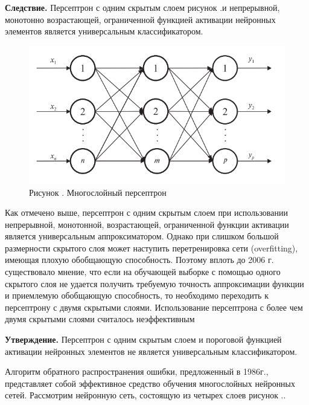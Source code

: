{	\par \redline \textbf{Следствие.} Персептрон с одним скрытым слоем рисунок \thechaptercntr.\theimagecntr \spc и непрерывной,
	монотонно возрастающей, ограниченной функцией активации нейронных элементов является универсальным классификатором.
	
	\begin{figure}[H]
		\centering
		\def\svgwidth{\textwidth}
		\includegraphics[scale=1.2]{images/one_hidden_perceptron.png}
		\caption*{\gostFont Рисунок \thechaptercntr .\theimagecntr \spc {--} Многослойный персептрон}
	\end{figure}  \addtocounter{imagecntr}{1}
	
	\par \redline Как отмечено выше, персептрон с одним скрытым слоем при использовании непрерывной, монотонной, возрастающей, ограниченной
	функции активации является универсальным аппроксиматором. Однако
	при слишком большой размерности скрытого слоя может наступить
	перетренировка сети (overfitting), имеющая плохую обобщающую способность. Поэтому вплоть до 2006 г. существовало мнение, что если на
	обучающей выборке с помощью одного скрытого слоя не удается получить требуемую точность аппроксимации функции и приемлемую
	обобщающую способность, то необходимо переходить к персептрону с
	двумя скрытыми слоями. Использование персептрона с более чем двумя скрытыми слоями считалось неэффективным
	
	\par \redline \textbf{Утверждение.} Персептрон с одним скрытым слоем и пороговой
	функцией активации нейронных элементов не является универсальным
	классификатором.
	
	\par \redline Алгоритм обратного распространения ошибки, предложенный в 1986г., представляет собой эффективное средство обучения многослойных нейронных сетей. Рассмотрим нейронную сеть, состоящую из четырех слоев рисунок \thechaptercntr.\theimagecntr.
	
}
